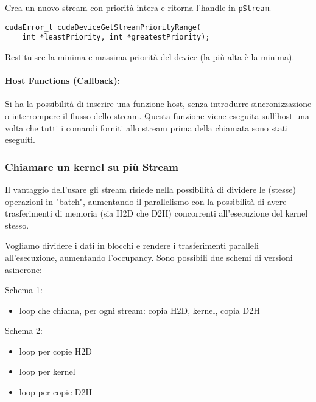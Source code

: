 Crea un nuovo stream con priorità intera e ritorna l'handle in \texttt{pStream}.

\begin{lstlisting}
cudaError_t cudaDeviceGetStreamPriorityRange(
    int *leastPriority, int *greatestPriority);
\end{lstlisting}

Restituisce la minima e massima priorità del device (la più alta è la minima).

\paragraph{Host Functions (Callback):} Si ha la possibilità di inserire una funzione host, senza introdurre sincronizzazione o interrompere il flusso dello stream. Questa funzione viene eseguita sull'host una volta che tutti i comandi forniti allo stream prima della chiamata sono stati eseguiti.

\subsubsection{Chiamare un kernel su più Stream}

Il vantaggio dell'usare gli stream risiede nella possibilità di dividere le (stesse) operazioni in "batch", aumentando il parallelismo con la possibilità di avere trasferimenti di memoria (sia H2D che D2H) concorrenti all'esecuzione del kernel stesso. 

Vogliamo dividere i dati in blocchi e rendere i trasferimenti paralleli all'esecuzione, aumentando l'occupancy. Sono possibili due schemi di versioni asincrone: 

\begin{minipage}{.4\linewidth}
	Schema 1: 
	\begin{itemize}
		\item loop che chiama, per ogni stream: copia H2D, kernel, copia D2H
	\end{itemize}
\end{minipage}
\hfill 
\begin{minipage}{.4\linewidth}
	Schema 2:
	\begin{itemize}
		\item loop per copie H2D
		
		\item loop per kernel
		
		\item loop per copie D2H
	\end{itemize} 
\end{minipage}

